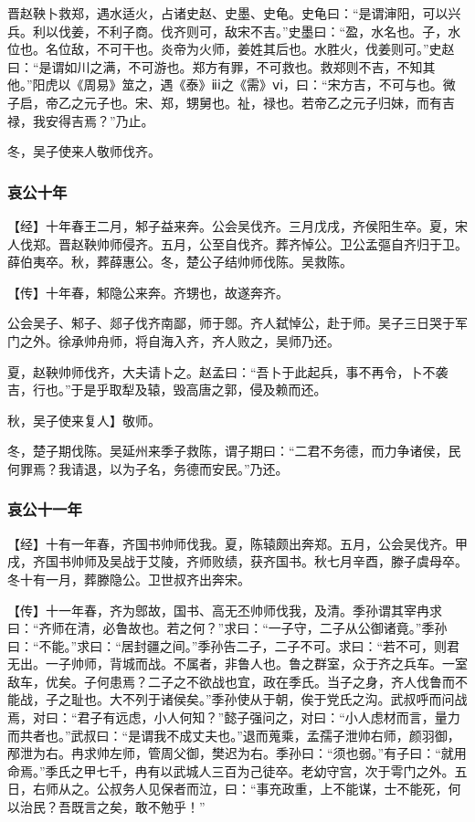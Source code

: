 \documentclass[]{article}
\begin{document}
晋赵鞅卜救郑，遇水适火，占诸史赵、史墨、史龟。史龟曰：``是谓渖阳，可以兴兵。利以伐姜，不利子商。伐齐则可，敌宋不吉。''史墨曰：``盈，水名也。子，水位也。名位敌，不可干也。炎帝为火师，姜姓其后也。水胜火，伐姜则可。''史赵曰：``是谓如川之满，不可游也。郑方有罪，不可救也。救郑则不吉，不知其他。''阳虎以《周易》筮之，遇《泰》ⅱⅰ之《需》ⅴⅰ，曰：``宋方吉，不可与也。微子启，帝乙之元子也。宋、郑，甥舅也。祉，禄也。若帝乙之元子归妹，而有吉禄，我安得吉焉？''乃止。

冬，吴子使来人敬师伐齐。

\hypertarget{header-n3145}{%
\subsubsection{哀公十年}\label{header-n3145}}

【经】十年春王二月，邾子益来奔。公会吴伐齐。三月戊戌，齐侯阳生卒。夏，宋人伐郑。晋赵鞅帅师侵齐。五月，公至自伐齐。葬齐悼公。卫公孟彄自齐归于卫。薛伯夷卒。秋，葬薛惠公。冬，楚公子结帅师伐陈。吴救陈。

【传】十年春，邾隐公来奔。齐甥也，故遂奔齐。

公会吴子、邾子、郯子伐齐南鄙，师于鄎。齐人弑悼公，赴于师。吴子三日哭于军门之外。徐承帅舟师，将自海入齐，齐人败之，吴师乃还。

夏，赵鞅帅师伐齐，大夫请卜之。赵孟曰：``吾卜于此起兵，事不再令，卜不袭吉，行也。''于是乎取犁及辕，毁高唐之郭，侵及赖而还。

秋，吴子使来复人】敬师。

冬，楚子期伐陈。吴延州来季子救陈，谓子期曰：``二君不务德，而力争诸侯，民何罪焉？我请退，以为子名，务德而安民。''乃还。

\hypertarget{header-n3154}{%
\subsubsection{哀公十一年}\label{header-n3154}}

【经】十有一年春，齐国书帅师伐我。夏，陈辕颇出奔郑。五月，公会吴伐齐。甲戌，齐国书帅师及吴战于艾陵，齐师败绩，获齐国书。秋七月辛酉，滕子虞母卒。冬十有一月，葬滕隐公。卫世叔齐出奔宋。

【传】十一年春，齐为鄎故，国书、高无丕帅师伐我，及清。季孙谓其宰冉求曰：``齐师在清，必鲁故也。若之何？''求曰：``一子守，二子从公御诸竟。''季孙曰：``不能。''求曰：``居封疆之间。''季孙告二子，二子不可。求曰：``若不可，则君无出。一子帅师，背城而战。不属者，非鲁人也。鲁之群室，众于齐之兵车。一室敌车，优矣。子何患焉？二子之不欲战也宜，政在季氏。当子之身，齐人伐鲁而不能战，子之耻也。大不列于诸侯矣。''季孙使从于朝，俟于党氏之沟。武叔呼而问战焉，对曰：``君子有远虑，小人何知？''懿子强问之，对曰：``小人虑材而言，量力而共者也。''武叔曰：``是谓我不成丈夫也。''退而蒐乘，孟孺子泄帅右师，颜羽御，邴泄为右。冉求帅左师，管周父御，樊迟为右。季孙曰：``须也弱。''有子曰：``就用命焉。''季氏之甲七千，冉有以武城人三百为己徒卒。老幼守宫，次于雩门之外。五日，右师从之。公叔务人见保者而泣，曰：``事充政重，上不能谋，士不能死，何以治民？吾既言之矣，敢不勉乎！''
\end{document}
